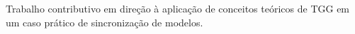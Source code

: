 \documentclass[cic,resumo-unibral]{iiufrgs}
\begin{document}
\begin{extendedsummary}
Trabalho contributivo em direção à aplicação de conceitos teóricos de TGG em um caso prático de sincronização de modelos.



%




\end{extendedsummary}
\end{document}
